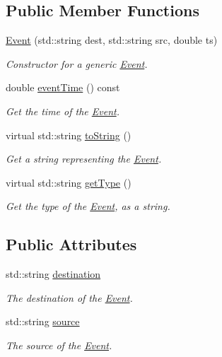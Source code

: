 \subsection*{\-Public \-Member \-Functions}
\begin{DoxyCompactItemize}
\item 
\hyperlink{classEvent_a2ff6ddc14b006baade2b5ab2a622835d}{\-Event} (std\-::string dest, std\-::string src, double ts)
\begin{DoxyCompactList}\small\item\em \-Constructor for a generic \hyperlink{classEvent}{\-Event}. \end{DoxyCompactList}\item 
\hypertarget{classEvent_a79ba42604867e6f81ec29d9eaff0dc08}{double \hyperlink{classEvent_a79ba42604867e6f81ec29d9eaff0dc08}{event\-Time} () const }\label{classEvent_a79ba42604867e6f81ec29d9eaff0dc08}

\begin{DoxyCompactList}\small\item\em \-Get the time of the \hyperlink{classEvent}{\-Event}. \end{DoxyCompactList}\item 
\hypertarget{classEvent_a924194a887aa70888e08a04b69389bd6}{virtual std\-::string \hyperlink{classEvent_a924194a887aa70888e08a04b69389bd6}{to\-String} ()}\label{classEvent_a924194a887aa70888e08a04b69389bd6}

\begin{DoxyCompactList}\small\item\em \-Get a string representing the \hyperlink{classEvent}{\-Event}. \end{DoxyCompactList}\item 
\hypertarget{classEvent_a3e3dfee48cea1b42321adae3c51f82e2}{virtual std\-::string \hyperlink{classEvent_a3e3dfee48cea1b42321adae3c51f82e2}{get\-Type} ()}\label{classEvent_a3e3dfee48cea1b42321adae3c51f82e2}

\begin{DoxyCompactList}\small\item\em \-Get the type of the \hyperlink{classEvent}{\-Event}, as a string. \end{DoxyCompactList}\end{DoxyCompactItemize}
\subsection*{\-Public \-Attributes}
\begin{DoxyCompactItemize}
\item 
std\-::string \hyperlink{classEvent_aa28be1a89b2516ea9f570ff619f754bc}{destination}
\begin{DoxyCompactList}\small\item\em \-The destination of the \hyperlink{classEvent}{\-Event}. \end{DoxyCompactList}\item 
std\-::string \hyperlink{classEvent_abc9c246c173d3433d2ffc0a4ed35bc01}{source}
\begin{DoxyCompactList}\small\item\em \-The source of the \hyperlink{classEvent}{\-Event}. \end{DoxyCompactList}\end{DoxyCompactItemize}
